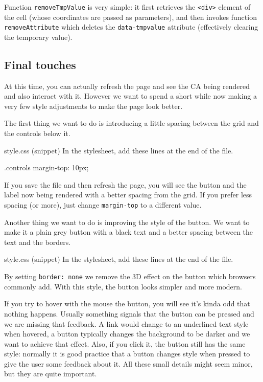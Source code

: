 Function \texttt{removeTmpValue} is very simple: it first retrieves the \texttt{<div>} element of the cell
(whose coordinates are passed as parameters), and then invokes function \texttt{removeAttribute} which
deletes the \texttt{data-tmpvalue} attribute (effectively clearing the temporary value).

\subsection{Final touches}
At this time, you can actually refresh the page and see the CA being rendered and also interact with it.
However we want to spend a short while now making a very few style adjustments to make the page look better.

The first thing we want to do is introducing a little spacing between the grid and the controls below it.

\begin{programcode}{style.css (snippet)}
In the stylesheet, add these lines at the end of the file.
\begin{codecss}
.controls {
  margin-top: 10px;
}
\end{codecss}
\end{programcode}

If you save the file and then refresh the page, you will see
the button and the label now being rendered with a better
spacing from the grid. If you prefer less spacing (or more), just change \texttt{margin-top} to a different
value.

Another thing we want to do is improving the style of the button. We want to make it a plain grey button
with a black text and a better spacing between the text and the borders.

\begin{programcode}{style.css (snippet)}
In the stylesheet, add these lines at the end of the file.
\end{programcode}

By setting \texttt{border: none} we remove the 3D effect on the button which browsers commonly add.
With this style, the button looks simpler and more modern.

If you try to hover with the mouse the button, you will see it's kinda odd that nothing happens. Usually
something signals that the button can be pressed and we are missing that feedback. A link would change to
an underlined text style when hovered, a button typically changes the background to be darker and we want to
achieve that effect. Also, if you click it, the button still has the same style: normally it is good
practice that a button changes style when pressed to give the user some feedback about it. All these
small details might seem minor, but they are quite important.

